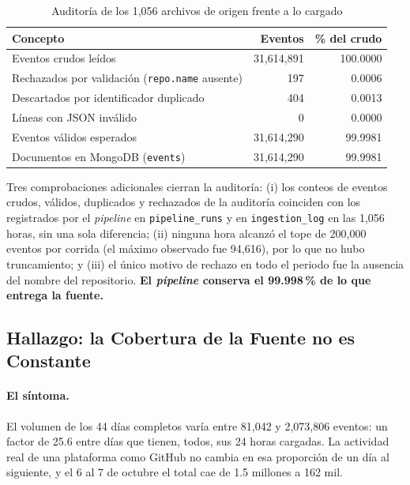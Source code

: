 \begin{table}[H]
\centering
\caption{Auditoría de los 1,056 archivos de origen frente a lo cargado}
\label{tab:auditoria}
\vspace{0.2cm}
\small
\begin{tabular}{@{}lrr@{}}
\toprule
\textbf{Concepto} & \textbf{Eventos} & \textbf{\% del crudo} \\
\midrule
Eventos crudos leídos                               & 31,614,891 & 100.0000 \\
Rechazados por validación (\texttt{repo.name} ausente) &        197 &   0.0006 \\
Descartados por identificador duplicado             &        404 &   0.0013 \\
Líneas con JSON inválido                            &          0 &   0.0000 \\
\midrule
Eventos válidos esperados                           & 31,614,290 &  99.9981 \\
Documentos en MongoDB (\texttt{events})             & 31,614,290 &  99.9981 \\
\bottomrule
\end{tabular}
\end{table}

Tres comprobaciones adicionales cierran la auditoría: (i) los conteos de eventos crudos, válidos, duplicados y rechazados de la auditoría coinciden con los registrados por el \textit{pipeline} en \texttt{pipeline\_runs} y en \texttt{ingestion\_log} en las 1,056 horas, sin una sola diferencia; (ii) ninguna hora alcanzó el tope de 200,000 eventos por corrida (el máximo observado fue 94,616), por lo que no hubo truncamiento; y (iii) el único motivo de rechazo en todo el periodo fue la ausencia del nombre del repositorio. \textbf{El \textit{pipeline} conserva el 99.998\,\% de lo que entrega la fuente.}

\subsection{Hallazgo: la Cobertura de la Fuente no es Constante}
\label{subsec:cobertura}

\paragraph{El síntoma.} El volumen de los 44 días completos varía entre 81,042 y 2,073,806 eventos: un factor de 25.6 entre días que tienen, todos, sus 24 horas cargadas. La actividad real de una plataforma como GitHub no cambia en esa proporción de un día al siguiente, y el 6 al 7 de octubre el total cae de 1.5 millones a 162 mil.

